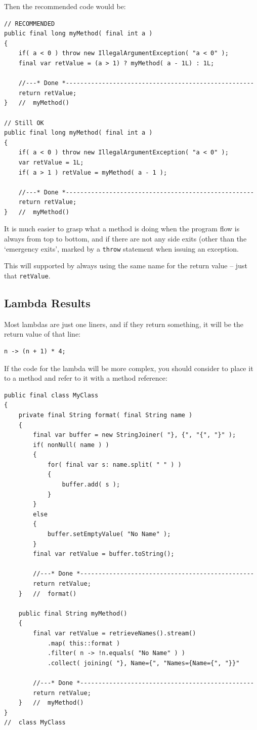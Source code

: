 \documentclass[11pt,a4paper, titlepage, parskip=half, headsepline, footsepline, cleardoublepage=current, headheight=1cm]{scrbook}
\begin{document}
Then the recommended code would be:
\begin{lstlisting}
// RECOMMENDED
public final long myMethod( final int a )
{
    if( a < 0 ) throw new IllegalArgumentException( "a < 0" );
    final var retValue = (a > 1) ? myMethod( a - 1L) : 1L;
    
    //---* Done *----------------------------------------------------
    return retValue;
}   //  myMethod()

// Still OK
public final long myMethod( final int a )
{
    if( a < 0 ) throw new IllegalArgumentException( "a < 0" );
    var retValue = 1L;
    if( a > 1 ) retValue = myMethod( a - 1 );
    
    //---* Done *----------------------------------------------------
    return retValue;
}   //  myMethod()
\end{lstlisting}

It is much easier to grasp what a method is doing when the program flow is always from top to bottom, and if there are not any side exits (other than the ‘emergency exits’, marked by a \lstinline|throw| statement when issuing an exception.

This will supported by always using the same name for the return value – just that \lstinline|retValue|.

\subsection{Lambda Results}\label{sec:LambdaResults}
Most lambdas are just one liners, and if they return something, it will be the return value of that line:
\begin{lstlisting}
n -> (n + 1) * 4; 
\end{lstlisting}

If the code for the lambda will be more complex, you should consider to place it to a method and
refer to it with a method reference:
\begin{lstlisting}
public final class MyClass
{
    private final String format( final String name )
    {
        final var buffer = new StringJoiner( "}, {", "{", "}" );
        if( nonNull( name ) )
        {
            for( final var s: name.split( " " ) )
            {
                buffer.add( s );
            }
        }
        else
        {
            buffer.setEmptyValue( "No Name" );
        }
        final var retValue = buffer.toString();
        
        //---* Done *------------------------------------------------
        return retValue;
    }   //  format()
    
    public final String myMethod()
    {
        final var retValue = retrieveNames().stream()
            .map( this::format )
            .filter( n -> !n.equals( "No Name" ) )
            .collect( joining( "}, Name={", "Names={Name={", "}}"
        
        //---* Done *------------------------------------------------
        return retValue;
    }   //  myMethod()
}
//  class MyClass
\end{lstlisting}
\end{document}
